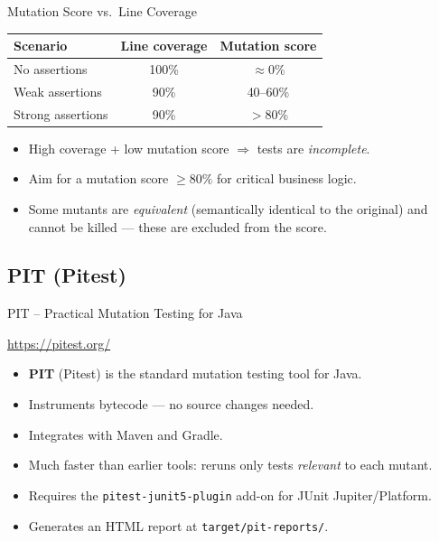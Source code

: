 \documentclass[11pt, xcolor=svgnames]{beamer}
\providecommand{\alert}[1]{\textbf{#1}}
\begin{document}

\begin{frame}{Mutation Score vs.~Line Coverage}

\begin{center}
\begin{tabular}{lcc}
  \hline
  Scenario & Line coverage & Mutation score \\
  \hline
  No assertions     & 100\% & $\approx$0\%   \\
  Weak assertions   & 90\%  & 40--60\%        \\
  Strong assertions & 90\%  & $>$80\%         \\
  \hline
\end{tabular}
\end{center}

\vspace{0.5em}
\begin{itemize}
  \item High coverage + low mutation score $\Rightarrow$ tests are \emph{incomplete}.
  \item Aim for a mutation score $\geq 80\%$ for critical business logic.
  \item Some mutants are \emph{equivalent} (semantically identical to the original) and cannot be killed --- these are excluded from the score.
\end{itemize}

\end{frame}


\subsection{PIT (Pitest)}


\begin{frame}{PIT -- Practical Mutation Testing for Java}

\begin{block}{}
  \centering \url{https://pitest.org/}
\end{block}

\begin{itemize}
  \item \alert{PIT} (Pitest) is the standard mutation testing tool for Java.
  \item Instruments bytecode --- no source changes needed.
  \item Integrates with Maven and Gradle.
  \item Much faster than earlier tools: reruns only tests \emph{relevant} to each mutant.
  \item Requires the \texttt{pitest-junit5-plugin} add-on for JUnit Jupiter/Platform.
  \item Generates an HTML report at \texttt{target/pit-reports/}.
\end{itemize}

\end{frame}
\end{document}
